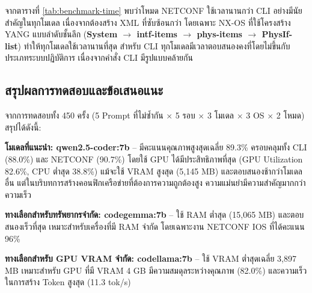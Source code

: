 \hspace*{1.3em}
จากตารางที่ \ref{tab:benchmark-time} พบว่าโหมด NETCONF ใช้เวลานานกว่า CLI อย่างมีนัยสำคัญในทุกโมเดล เนื่องจากต้องสร้าง XML ที่ซับซ้อนกว่า โดยเฉพาะ NX-OS ที่ใช้โครงสร้าง YANG แบบลำดับชั้นลึก (\textbf{System $\rightarrow$ intf-items $\rightarrow$ phys-items $\rightarrow$ PhysIf-list}) ทำให้ทุกโมเดลใช้เวลานานที่สุด สำหรับ CLI ทุกโมเดลมีเวลาตอบสนองคงที่โดยไม่ขึ้นกับประเภทระบบปฏิบัติการ เนื่องจากคำสั่ง CLI มีรูปแบบคล้ายกัน

\subsection{สรุปผลการทดสอบและข้อเสนอแนะ}
\hspace*{1.3em}
จากการทดสอบทั้ง 450 ครั้ง (5 Prompt ที่ไม่ซ้ำกัน $\times$ 5 รอบ $\times$ 3 โมเดล $\times$ 3 OS $\times$ 2 โหมด) สรุปได้ดังนี้:

\hspace*{1.3em}
\textbf{โมเดลที่แนะนำ: qwen2.5-coder:7b} -- มีคะแนนคุณภาพสูงสุดเฉลี่ย 89.3\% ครอบคลุมทั้ง CLI (88.0\%) และ NETCONF (90.7\%) โดยใช้ GPU ได้มีประสิทธิภาพที่สุด (GPU Utilization 82.6\%, CPU ต่ำสุด 38.8\%) แม้จะใช้ VRAM สูงสุด (5,145 MB) และตอบสนองช้ากว่าโมเดลอื่น แต่ในบริบทการสร้างคอนฟิกเครือข่ายที่ต้องการความถูกต้องสูง ความแม่นยำมีความสำคัญมากกว่าความเร็ว

\hspace*{1.3em}
\textbf{ทางเลือกสำหรับทรัพยากรจำกัด: codegemma:7b} -- ใช้ RAM ต่ำสุด (15,065 MB) และตอบสนองเร็วที่สุด เหมาะสำหรับเครื่องที่มี RAM จำกัด โดยเฉพาะงาน NETCONF IOS ที่ได้คะแนน 96\%

\hspace*{1.3em}
\textbf{ทางเลือกสำหรับ GPU VRAM จำกัด: codellama:7b} -- ใช้ VRAM ต่ำสุดเฉลี่ย 3,897 MB เหมาะสำหรับ GPU ที่มี VRAM 4 GB มีความสมดุลระหว่างคุณภาพ (82.0\%) และความเร็วในการสร้าง Token สูงสุด (11.3 tok/s)






































